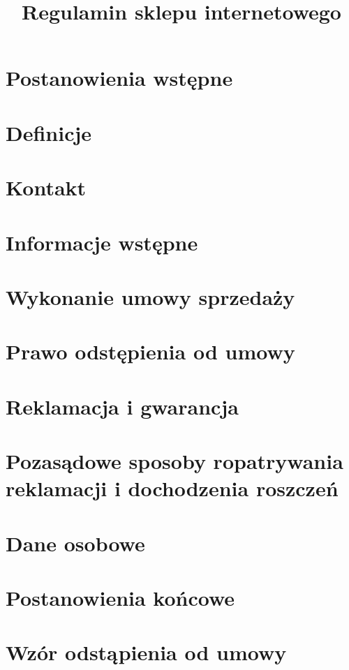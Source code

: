 \documentclass[10pt,a4paper]{article}
\title{Regulamin sklepu internetowego \shopname} %
\author{}
\date{}
\begin{document}
	\maketitle

	\section{Postanowienia wstępne}
		

	\section{Definicje}
		
	
	\section{Kontakt}
		
		
	\section{Informacje wstępne}
		
		
	\section{Wykonanie umowy sprzedaży}
		
		
	\section{Prawo odstępienia od umowy}
		
			
	\section{Reklamacja i gwarancja}
		
			
	\section{Pozasądowe sposoby ropatrywania reklamacji i dochodzenia roszczeń}
		
			
	\section{Dane osobowe}
		
			
	\section{Postanowienia końcowe}
		
		
	\section{Wzór odstąpienia od umowy}
		
	
\end{document}
